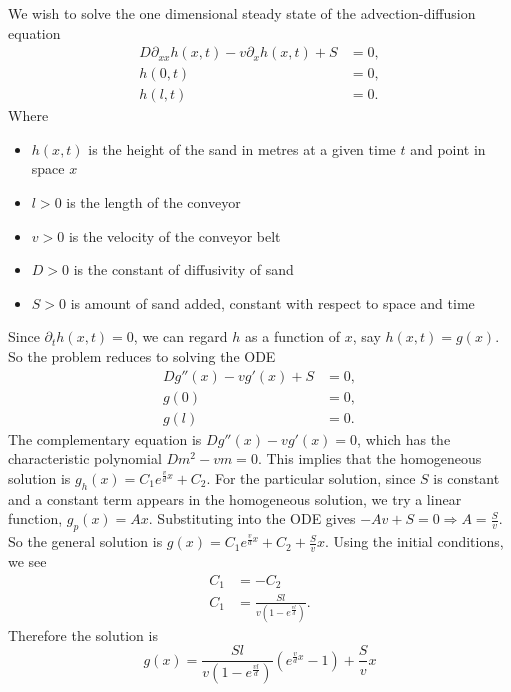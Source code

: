 \documentclass{article}
\begin{document}
\newpage
We wish to solve the one dimensional steady state of the advection-diffusion equation
\begin{align}
    D\partial_{xx}h(x,t)-v\partial_xh(x,t)+S&=0, \\
    h(0,t)&=0,\\
    h(l,t)&=0.
\end{align}
Where 
\begin{itemize}
    \item
    $h(x,t)$ is the height of the sand in metres at a given time $t$ and point in space $x$
    
    \item
    $l>0$ is the length of the conveyor

    \item
    $v>0$ is the velocity of the conveyor belt

    \item 
    $D>0$ is the constant of diffusivity of sand

    \item 
    $S>0$ is amount of sand added, constant with respect to space and time


    
\end{itemize}
Since $\partial_th(x,t)=0$, we can regard $h$ as a function of $x$, say $h(x,t)=g(x)$. So the problem reduces to solving the ODE
\begin{equation}
    \begin{split}
        Dg''(x)-vg'(x)+S&=0, \\
        g(0)&=0,\\
        g(l)&=0.
    \end{split}
\end{equation}
The complementary equation is $Dg''(x)-vg'(x)=0$, which has the characteristic polynomial $Dm^2-vm=0$. This implies that the homogeneous solution is $g_h(x)=C_1e^{\frac{v}{d}x}+C_2$. For the particular solution, since $S$ is constant and a constant term appears in the homogeneous solution, we try a linear function, $g_p(x)=Ax$. Substituting into the ODE gives $-Av+S=0\Rightarrow A=\frac{S}{v}$. So the general solution is $g(x)=C_1e^{\frac{v}{d}x}+C_2+\frac{S}{v}x$. Using the initial conditions, we see 
\begin{align*}
    C_1&=-C_2\\
    C_1&=\frac{Sl}{v(1-e^{\frac{vl}{d}})}.
\end{align*}
Therefore the solution is
\begin{equation*}
    g(x)=\frac{Sl}{v(1-e^{\frac{vl}{d}})}\left(e^{\frac{v}{d}x}-1\right)+\frac{S}{v}x
\end{equation*}
\end{document}
